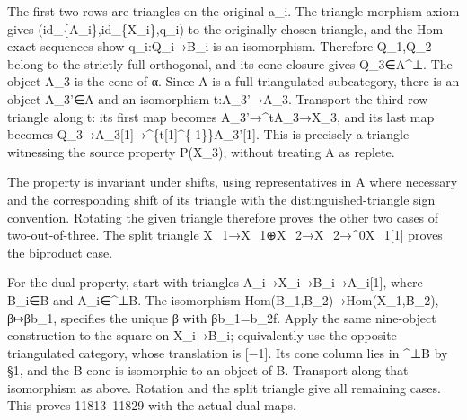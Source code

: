 The first two rows are triangles on the original a\_\allowbreak{}i. The triangle morphism axiom gives (id\_\allowbreak{}\{A\_\allowbreak{}i\},\allowbreak{}id\_\allowbreak{}\{X\_\allowbreak{}i\},\allowbreak{}q\_\allowbreak{}i)\allowbreak{} to the originally chosen triangle,\allowbreak{} and the Hom exact sequences show q\_\allowbreak{}i:\allowbreak{}Q\_\allowbreak{}i\allowbreak{}→B\_\allowbreak{}i is an isomorphism. Therefore Q\_\allowbreak{}1,\allowbreak{}Q\_\allowbreak{}2 belong to the strictly full orthogonal,\allowbreak{} and its cone closure gives Q\_\allowbreak{}3\allowbreak{}∈A\textasciicircum{}⊥. The object A\_\allowbreak{}3 is the cone of α. Since A is a full triangulated subcategory,\allowbreak{} there is an object A\_\allowbreak{}3'\allowbreak{}∈A and an isomorphism t:\allowbreak{}A\_\allowbreak{}3'\allowbreak{}→A\_\allowbreak{}3. Transport the third-row triangle along t:\allowbreak{} its first map becomes A\_\allowbreak{}3'\allowbreak{}→\textasciicircum{}tA\_\allowbreak{}3\allowbreak{}→X\_\allowbreak{}3,\allowbreak{} and its last map becomes Q\_\allowbreak{}3\allowbreak{}→A\_\allowbreak{}3[1]\allowbreak{}\allowbreak{}→\textasciicircum{}\{t[1]\allowbreak{}\textasciicircum{}\{-1\}\}A\_\allowbreak{}3'[1]\allowbreak{}. This is precisely a triangle witnessing the source property P(X\_\allowbreak{}3)\allowbreak{},\allowbreak{} without treating A as replete.

The property is invariant under shifts,\allowbreak{} using representatives in A where necessary and the corresponding shift of its triangle with the distinguished-triangle sign convention. Rotating the given triangle therefore proves the other two cases of two-out-of-three. The split triangle X\_\allowbreak{}1\allowbreak{}→X\_\allowbreak{}1\allowbreak{}⊕X\_\allowbreak{}2\allowbreak{}→X\_\allowbreak{}2\allowbreak{}→\textasciicircum{}0X\_\allowbreak{}1[1]\allowbreak{} proves the biproduct case.

For the dual property,\allowbreak{} start with triangles A\_\allowbreak{}i\allowbreak{}→X\_\allowbreak{}i\allowbreak{}→B\_\allowbreak{}i\allowbreak{}→A\_\allowbreak{}i[1]\allowbreak{},\allowbreak{} where B\_\allowbreak{}i\allowbreak{}∈B and A\_\allowbreak{}i\allowbreak{}∈\textasciicircum{}⊥B. The isomorphism Hom(B\_\allowbreak{}1,\allowbreak{}B\_\allowbreak{}2)\allowbreak{}\allowbreak{}→Hom(X\_\allowbreak{}1,\allowbreak{}B\_\allowbreak{}2)\allowbreak{},\allowbreak{} β\allowbreak{}↦βb\_\allowbreak{}1,\allowbreak{} specifies the unique β with βb\_\allowbreak{}1\allowbreak{}=b\_\allowbreak{}2f. Apply the same nine-object construction to the square on X\_\allowbreak{}i\allowbreak{}→B\_\allowbreak{}i; equivalently use the opposite triangulated category,\allowbreak{} whose translation is [−1]\allowbreak{}. Its cone column lies in \^{}⊥B by §1,\allowbreak{} and the B cone is isomorphic to an object of B. Transport along that isomorphism as above. Rotation and the split triangle give all remaining cases. This proves 11813–\allowbreak{}11829 with the actual dual maps.

